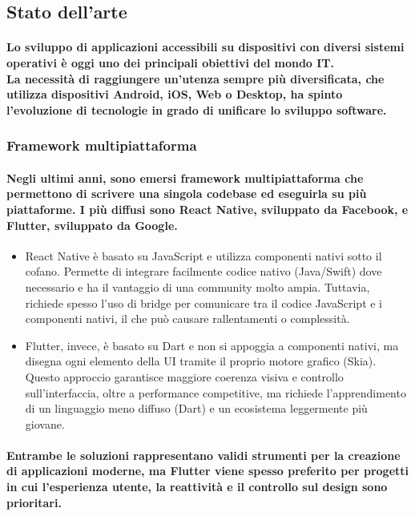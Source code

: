 \subsection{Stato dell’arte}

\paragraph{Lo sviluppo di applicazioni accessibili su dispositivi con diversi sistemi 
operativi è oggi uno dei principali obiettivi del mondo IT.\\ 
La necessità di raggiungere un'utenza sempre più diversificata, 
che utilizza dispositivi Android, iOS, Web o Desktop, ha spinto l’evoluzione di tecnologie in grado 
di unificare lo sviluppo software.
}

\subsubsection{Framework multipiattaforma}

\paragraph{Negli ultimi anni, sono emersi framework multipiattaforma che permettono 
di scrivere una singola codebase ed eseguirla su più piattaforme.
I più diffusi sono \textbf{React Native}, sviluppato da Facebook, e \textbf{Flutter}, sviluppato da Google.
}

\begin{itemize}
  \item React Native è basato su JavaScript e utilizza componenti nativi sotto il cofano. Permette di integrare facilmente codice nativo (Java/Swift) dove necessario e ha il vantaggio di una community molto ampia. Tuttavia, richiede spesso l’uso di bridge per comunicare tra il codice JavaScript e i componenti nativi, il che può causare rallentamenti o complessità.
  \item Flutter, invece, è basato su Dart e non si appoggia a componenti nativi, ma disegna ogni elemento della UI tramite il proprio motore grafico (Skia). Questo approccio garantisce maggiore coerenza visiva e controllo sull’interfaccia, oltre a performance competitive, ma richiede l’apprendimento di un linguaggio meno diffuso (Dart) e un ecosistema leggermente più giovane.
\end{itemize}

\paragraph{Entrambe le soluzioni rappresentano validi strumenti per la creazione di applicazioni moderne, ma Flutter viene spesso preferito per progetti in cui l’esperienza utente, la reattività e il controllo sul design sono prioritari.
}

